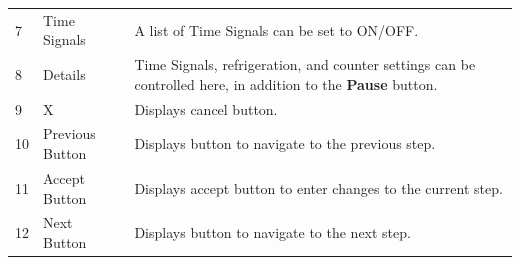 \begin{longtable}[]{@{}|l|l|l|@{}}
\begin{minipage}[t]{0.04\columnwidth}
7\strut
\end{minipage} & \begin{minipage}[t]{0.23\columnwidth}\raggedright
Time Signals\strut
\end{minipage} & \begin{minipage}[t]{0.65\columnwidth}\raggedright
A list of Time Signals can be set to ON/OFF.\strut
\end{minipage}\tabularnewline
\begin{minipage}[t]{0.04\columnwidth}\raggedright
8\strut
\end{minipage} & \begin{minipage}[t]{0.23\columnwidth}\raggedright
Details\strut
\end{minipage} & \begin{minipage}[t]{0.65\columnwidth}\raggedright
Time Signals, refrigeration, and counter settings can be controlled
here, in addition to the \textbf{Pause} button.\strut
\end{minipage}\tabularnewline
\begin{minipage}[t]{0.04\columnwidth}\raggedright
9\strut
\end{minipage} & \begin{minipage}[t]{0.23\columnwidth}\raggedright
X\strut
\end{minipage} & \begin{minipage}[t]{0.65\columnwidth}\raggedright
Displays cancel button.\strut
\end{minipage}\tabularnewline
\begin{minipage}[t]{0.04\columnwidth}\raggedright
10\strut
\end{minipage} & \begin{minipage}[t]{0.23\columnwidth}\raggedright
Previous Button\strut
\end{minipage} & \begin{minipage}[t]{0.65\columnwidth}\raggedright
Displays button to navigate to the previous step.\strut
\end{minipage}\tabularnewline
\begin{minipage}[t]{0.04\columnwidth}\raggedright
11\strut
\end{minipage} & \begin{minipage}[t]{0.23\columnwidth}\raggedright
Accept Button\strut
\end{minipage} & \begin{minipage}[t]{0.65\columnwidth}\raggedright
Displays accept button to enter changes to the current step.\strut
\end{minipage}\tabularnewline
\begin{minipage}[t]{0.04\columnwidth}\raggedright
12\strut
\end{minipage} & \begin{minipage}[t]{0.23\columnwidth}\raggedright
Next Button\strut
\end{minipage} & \begin{minipage}[t]{0.65\columnwidth}\raggedright
Displays button to navigate to the next step.\strut
\end{minipage}\tabularnewline
\bottomrule
\end{longtable}

